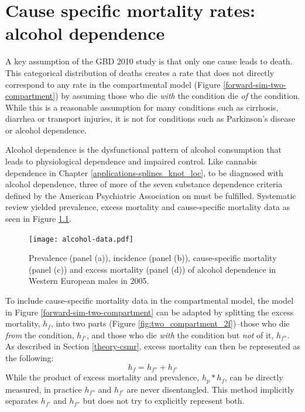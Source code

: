 \chapter{Cause specific mortality rates: alcohol dependence}
\label{applications-csmr}

A key assumption of the GBD 2010 study is that only one cause leads to death.  This categorical distribution of deaths creates a rate that does not directly correspond to any rate in the compartmental model (Figure \ref{forward-sim-two-compartment}) by assuming those who die \emph{with} the condition die \emph{of} the condition.  While this is a reasonable assumption for many conditions such as cirrhosis, diarrhea or transport injuries, it is not for conditions such as Parkinson's disease or alcohol dependence.

Alcohol dependence is the dysfunctional pattern of alcohol consumption that leads to physiological dependence and impaired control.  Like cannabis dependence in Chapter \ref{applications-splines_knot_loc}, to be diagnosed with alcohol dependence, three of more of the seven substance dependence criteria defined by the American Psychiatric Association on \pageref{tab:app-substance_dependence} must be fulfilled. \cite{american_diagnostic_2000, hasin_prevalence_2007}  Systematic review yielded prevalence, excess mortality and cause-specific mortality data as seen in Figure \ref{fig:app-alcohol data}.

    \begin{figure}[h]
        \begin{center}
            \texttt{[image: alcohol-data.pdf]}
            \caption{Prevalence (panel (a)), incidence (panel (b)), cause-specific mortality (panel (c)) and excess mortality (panel (d)) of alcohol dependence in Western European males in 2005.}
            \label{fig:app-alcohol data}
        \end{center}
    \end{figure}

To include cause-specific mortality data in the compartmental model, the model in Figure \ref{forward-sim-two-compartment} can be adapted by splitting the excess mortality, $h_{f}$, into two parts (Figure \ref{fig:two_compartment_2f})--those who die \emph{from} the condition, $h_{f'}$, and those who die \emph{with} the condition but \emph{not} of it, $h_{f''}$.  As described in Section \ref{theory-csmr}, excess mortality can then be represented as the following:
    \begin{equation}
        h_{f} = h_{f''} + h_{f'}
    \end{equation}
While the product of excess mortality and prevalence, $h_{p}*h_{f}$, can be directly measured, in practice $h_{f''}$ and $h_{f'}$ are never disentangled.  This method implicitly separates $h_{f'}$ and $h_{f''}$ but does not try to explicitly represent both.

